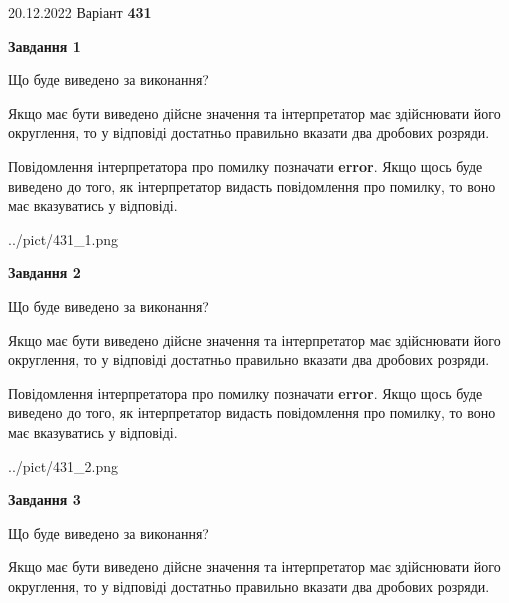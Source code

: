 \documentclass[12pt, ukrainian]{article}
\begin{document}
{20.12.2022 Варіант \No \textbf { 431 }\par}
{
\begin {Large}

{\begin {center}\textbf{Завдання 1}\end {center}}\par
Що буде виведено за виконання? \par

Якщо має бути виведено дійсне значення та інтерпретатор має здійснювати його округлення, 
то у відповіді достатньо правильно вказати два дробових розряди.

Повідомлення інтерпретатора про помилку позначати \textbf{error}.
Якщо щось буде виведено до того, як інтерпретатор видасть повідомлення про помилку, 
то воно має вказуватись у відповіді. \par

\begin{center}
	{../pict/431_1.png}
\end{center}
\newpage

{\begin {center}\textbf{Завдання 2}\end {center}}\par
Що буде виведено за виконання? \par

Якщо має бути виведено дійсне значення та інтерпретатор має здійснювати його округлення, 
то у відповіді достатньо правильно вказати два дробових розряди.

Повідомлення інтерпретатора про помилку позначати \textbf{error}.
Якщо щось буде виведено до того, як інтерпретатор видасть повідомлення про помилку, 
то воно має вказуватись у відповіді. \par

\begin{center}
	{../pict/431_2.png}
\end{center}
\newpage

{\begin {center}\textbf{Завдання 3}\end {center}}\par
Що буде виведено за виконання? \par

Якщо має бути виведено дійсне значення та інтерпретатор має здійснювати його округлення, 
то у відповіді достатньо правильно вказати два дробових розряди.


\end{Large}}
\end{document}
